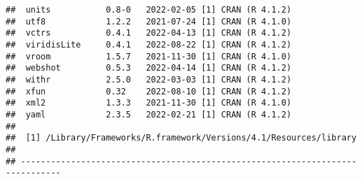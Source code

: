 \documentclass[
]{article}
\begin{document}
\begin{verbatim}
##  units           0.8-0   2022-02-05 [1] CRAN (R 4.1.2)
##  utf8            1.2.2   2021-07-24 [1] CRAN (R 4.1.0)
##  vctrs           0.4.1   2022-04-13 [1] CRAN (R 4.1.2)
##  viridisLite     0.4.1   2022-08-22 [1] CRAN (R 4.1.2)
##  vroom           1.5.7   2021-11-30 [1] CRAN (R 4.1.0)
##  webshot         0.5.3   2022-04-14 [1] CRAN (R 4.1.2)
##  withr           2.5.0   2022-03-03 [1] CRAN (R 4.1.2)
##  xfun            0.32    2022-08-10 [1] CRAN (R 4.1.2)
##  xml2            1.3.3   2021-11-30 [1] CRAN (R 4.1.0)
##  yaml            2.3.5   2022-02-21 [1] CRAN (R 4.1.2)
## 
##  [1] /Library/Frameworks/R.framework/Versions/4.1/Resources/library
## 
## ------------------------------------------------------------------------------
\end{verbatim}
\end{document}
